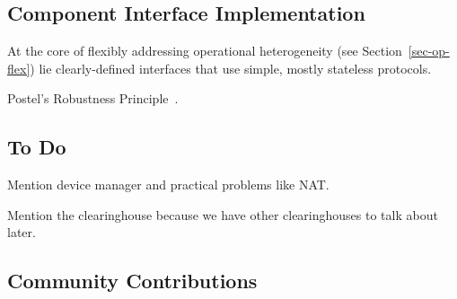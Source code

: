 \subsection{Component Interface Implementation}

At the core of flexibly addressing operational heterogeneity (see
Section~\ref{sec-op-flex}) lie clearly-defined interfaces
that use simple, mostly stateless protocols.

Postel's Robustness Principle~\cite[\S2.10]{rfc793}.


\subsection{To Do}

Mention device manager and practical problems like NAT.

Mention the clearinghouse because we have other clearinghouses
to talk about later.

\subsection{Community Contributions}

